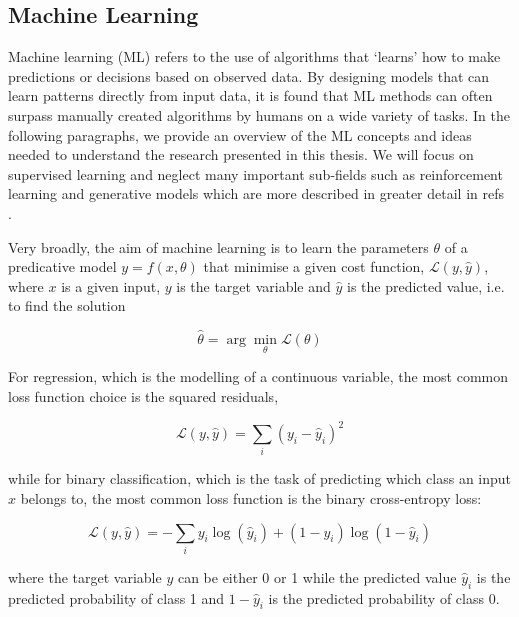 \subsection{Machine Learning} \label{ch:machine_learning}

Machine learning (ML) refers to the use of algorithms that `learns' how to make predictions or decisions based on observed data. By designing models that can learn patterns directly from input data, it is found that ML methods can often surpass manually created algorithms by humans on a wide variety of tasks. In the following paragraphs, we provide an overview of the ML concepts and ideas needed to understand the research presented in this thesis. We will focus on supervised learning and neglect many important sub-fields such as reinforcement learning and generative models which are more described in greater detail in refs \cite{Bishop2006PatternRecognition,Goodfellow2016DeepLearning}.

Very broadly, the aim of machine learning is to learn the parameters $\theta$ of a predicative model $y = f (x, \theta)$ that minimise a given cost function, $\mathcal{L}(y, \hat{y})$, where $x$ is a given input, $y$ is the target variable and $\hat{y}$ is the predicted value, i.e. to find the solution

\begin{equation}
    \hat{\theta} = \arg\min_{\theta} \mathcal{L}(\theta)
\end{equation}

For regression, which is the modelling of a continuous variable, the most common loss function choice is the squared residuals,

\begin{equation}
    \mathcal{L}(y, \hat{y}) = \sum_{i}(y_i - \hat{y}_i)^{2}
\end{equation}

while for binary classification, which is the task of predicting which class an input $x$ belongs to, the most common loss function is the binary cross-entropy loss:

\begin{equation}
    \mathcal{L}(y, \hat{y}) = -\sum_{i}y_i\log(\hat{y}_i) + (1 - y_i)\log(1 - \hat{y}_i)
\end{equation}

where the target variable $y$ can be either 0 or 1 while the predicted value $\hat{y}_i$ is the predicted probability of class 1 and $1-\hat{y}_i$ is the predicted probability of class 0.

